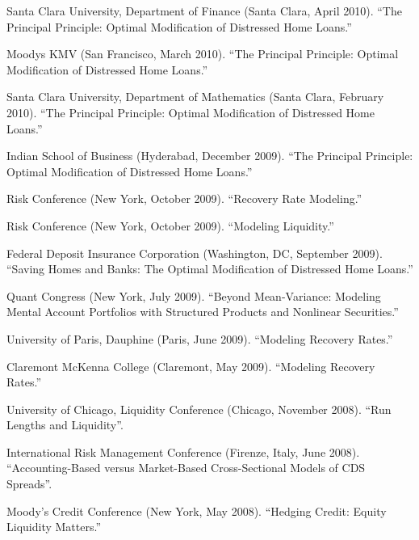\documentclass{article}
\begin{document}
\begin{etaremune}
{\item Santa Clara University, Department of Finance (Santa Clara, April 2010).
``The Principal Principle: Optimal Modification of Distressed Home Loans.''

\item Moodys KMV (San Francisco, March 2010).
``The Principal Principle: Optimal Modification of Distressed Home Loans.''

\item Santa Clara University, Department of Mathematics (Santa Clara, February 2010).
``The Principal Principle: Optimal Modification of Distressed Home Loans.''

\item Indian School of Business (Hyderabad, December 2009).
``The Principal Principle: Optimal Modification of Distressed Home Loans.''

\item Risk Conference (New York, October 2009). 
``Recovery Rate Modeling.'' 

\item Risk Conference (New York, October 2009). 
``Modeling Liquidity.'' 

\item Federal Deposit Insurance Corporation (Washington, DC, September 2009).
``Saving Homes and Banks: The Optimal Modification of Distressed Home Loans.''

\item Quant Congress (New York, July 2009).
``Beyond Mean-Variance: Modeling Mental Account Portfolios with Structured Products and Nonlinear Securities.''

\item University of Paris, Dauphine (Paris, June 2009).
``Modeling Recovery Rates.''

\item Claremont McKenna College (Claremont, May 2009).
``Modeling Recovery Rates.''

\item University of Chicago, Liquidity Conference (Chicago, November 2008). 
``Run Lengths and Liquidity''.

\item International Risk Management Conference (Firenze, Italy, June 2008). 
``Accounting-Based versus Market-Based Cross-Sectional Models of CDS Spreads''. 

\item Moody's Credit Conference (New York, May 2008). 
``Hedging Credit: Equity Liquidity Matters.''

}
\end{etaremune}
\end{document}
